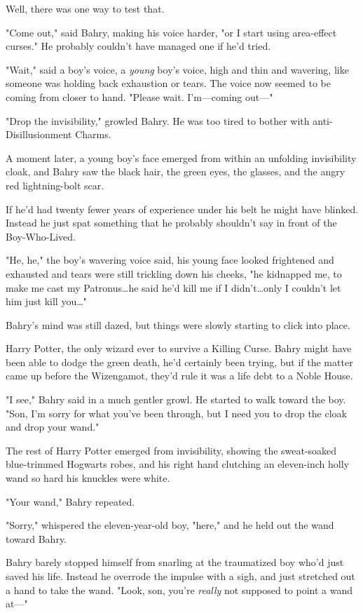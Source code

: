 Well, there was one way to test that.

"Come out," said Bahry, making his voice harder, "or I start using area-effect
curses." He probably couldn't have managed one if he'd tried.

"Wait," said a boy's voice, a \emph{young} boy's voice, high and thin and
wavering, like someone was holding back exhaustion or tears. The voice now
seemed to be coming from closer to hand. "Please wait. I'm---coming out---"

"Drop the invisibility," growled Bahry. He was too tired to bother with
anti-Disillusionment Charms.

A moment later, a young boy's face emerged from within an unfolding
invisibility cloak, and Bahry saw the black hair, the green eyes, the glasses,
and the angry red lightning-bolt scar.

If he'd had twenty fewer years of experience under his belt he might have
blinked. Instead he just spat something that he probably shouldn't say
in front of the Boy-Who-Lived.

"He, he," the boy's wavering voice said, his young face looked frightened and
exhausted and tears were still trickling down his cheeks, "he kidnapped me, to
make me cast my Patronus…he said he'd kill me if I didn't…only
I couldn't let him just kill you…"

Bahry's mind was still dazed, but things were slowly starting to click into
place.

Harry Potter, the only wizard ever to survive a Killing Curse. Bahry might have
been able to dodge the green death, he'd certainly been trying, but if the
matter came up before the Wizengamot, they'd rule it was a life debt to a Noble
House.

"I see," Bahry said in a much gentler growl. He started to walk toward the boy.
"Son, I'm sorry for what you've been through, but I need you to drop the cloak
and drop your wand."

The rest of Harry Potter emerged from invisibility, showing the sweat-soaked
blue-trimmed Hogwarts robes, and his right hand clutching an eleven-inch holly
wand so hard his knuckles were white.

"Your wand," Bahry repeated.

"Sorry," whispered the eleven-year-old boy, "here," and he held out the wand
toward Bahry.

Bahry barely stopped himself from snarling at the traumatized boy who'd just
saved his life. Instead he overrode the impulse with a sigh, and just stretched
out a hand to take the wand. "Look, son, you're \emph{really} not supposed to
point a wand at---"


